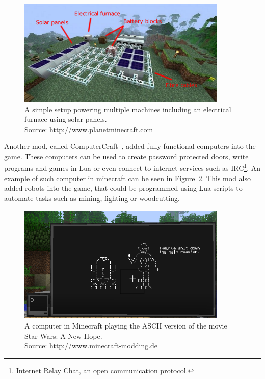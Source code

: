 \begin{figure}[h]
    \centering
    \includegraphics[width=10cm]{../img/ic-solar.pdf}
    \caption{A simple setup powering multiple machines including an electrical furnace using solar panels.
             \\Source: \href{http://static.planetminecraft.com/files/resource\_media/screenshot/1246/javaw-2012-11-12-20-51-09-46\_4122139.jpg}{http://www.planetminecraft.com}}
    \label{ic-solar}
\end{figure}

Another mod, called ComputerCraft~\cite{ComputerCraft}, added fully functional computers into the game. 
These computers can be used to create password protected
doors, write programs and games in Lua or even connect to internet services such as IRC\footnote{Internet Relay Chat, an open communication 
protocol.}. An example of such computer in minecraft can be seen in Figure~\ref{computer-craft}. This mod also added robots into the game, 
that could be programmed using Lua scripts to automate tasks such as mining, fighting or woodcutting.

\begin{figure}[h]
    \centering
    \includegraphics[width=10cm]{../img/ComputerCraft2.png}
    \caption{A computer in Minecraft playing the ASCII version of the movie Star Wars: A New Hope.
             \\Source: \href{http://minecraft-modding.de/wp-content/uploads/2015/06/ComputerCraft2.png}{http://www.minecraft-modding.de}}
    \label{computer-craft}
\end{figure}

